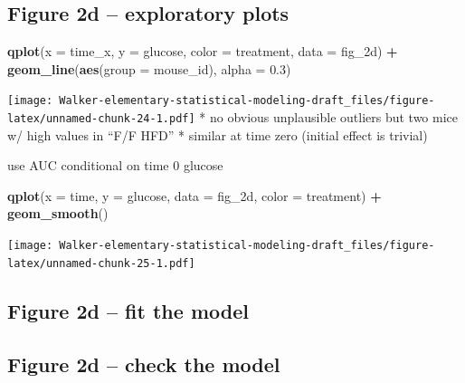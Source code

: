 \documentclass[]{book}
\newenvironment{Shaded}{\begin{snugshade}}{\end{snugshade}}
\newcommand{\DataTypeTok}[1]{\textcolor[rgb]{0.13,0.29,0.53}{#1}}
\newcommand{\FloatTok}[1]{\textcolor[rgb]{0.00,0.00,0.81}{#1}}
\newcommand{\KeywordTok}[1]{\textcolor[rgb]{0.13,0.29,0.53}{\textbf{#1}}}
\newcommand{\NormalTok}[1]{#1}
\newcommand{\OperatorTok}[1]{\textcolor[rgb]{0.81,0.36,0.00}{\textbf{#1}}}
\newcommand{\StringTok}[1]{\textcolor[rgb]{0.31,0.60,0.02}{#1}}
\begin{document}
\hypertarget{figure-2d-exploratory-plots}{%
\subsection{Figure 2d -- exploratory plots}\label{figure-2d-exploratory-plots}}

\begin{Shaded}
\begin{Highlighting}[]
\KeywordTok{qplot}\NormalTok{(}\DataTypeTok{x =}\NormalTok{ time_x, }\DataTypeTok{y =}\NormalTok{ glucose, }\DataTypeTok{color =}\NormalTok{ treatment, }\DataTypeTok{data =}\NormalTok{ fig_2d) }\OperatorTok{+}
\StringTok{  }\KeywordTok{geom_line}\NormalTok{(}\KeywordTok{aes}\NormalTok{(}\DataTypeTok{group =}\NormalTok{ mouse_id), }\DataTypeTok{alpha =} \FloatTok{0.3}\NormalTok{)}
\end{Highlighting}
\end{Shaded}

\texttt{[image: Walker-elementary-statistical-modeling-draft\_files/figure-latex/unnamed-chunk-24-1.pdf]}
* no obvious unplausible outliers but two mice w/ high values in ``F/F HFD''
* similar at time zero (initial effect is trivial)

use AUC conditional on time 0 glucose

\begin{Shaded}
\begin{Highlighting}[]
\KeywordTok{qplot}\NormalTok{(}\DataTypeTok{x =}\NormalTok{ time,}
      \DataTypeTok{y =}\NormalTok{ glucose,}
      \DataTypeTok{data =}\NormalTok{ fig_2d,}
      \DataTypeTok{color =}\NormalTok{ treatment) }\OperatorTok{+}
\StringTok{  }\KeywordTok{geom_smooth}\NormalTok{()}
\end{Highlighting}
\end{Shaded}

\texttt{[image: Walker-elementary-statistical-modeling-draft\_files/figure-latex/unnamed-chunk-25-1.pdf]}

\hypertarget{figure-2d-fit-the-model}{%
\subsection{Figure 2d -- fit the model}\label{figure-2d-fit-the-model}}

\hypertarget{figure-2d-check-the-model}{%
\subsection{Figure 2d -- check the model}\label{figure-2d-check-the-model}}
\end{document}
